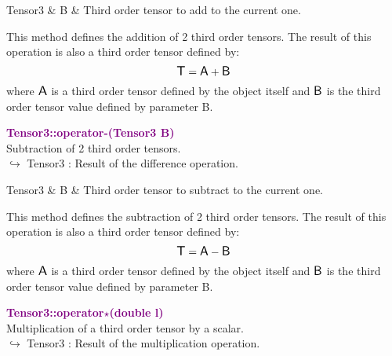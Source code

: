 \begin{tcolorbox}[width=\textwidth,myArgs,tabularx={ll|R}]
Tensor3 & B & Third order tensor to add to the current one.
\end{tcolorbox}

This method defines the addition of 2 third order tensors.
The result of this operation is also a third order tensor defined by:
\begin{equation*}
\mbox{\large\ensuremath{\mathsf{T}}} = \mbox{\large\ensuremath{\mathsf{A}}} + \mbox{\large\ensuremath{\mathsf{B}}}
\end{equation*}
where $\mbox{\large\ensuremath{\mathsf{A}}}$ is a third order tensor defined by the object itself and $\mbox{\large\ensuremath{\mathsf{B}}}$ is the third order tensor value defined by parameter B.

\textcolor{purple}{\textbf{Tensor3::operator-(Tensor3 B)}}\label{Tensor3::operator-(Tensor3 B)}\\
Subtraction of 2 third order tensors.\\ \hspace*{10mm}$\hookrightarrow$ Tensor3 : Result of the difference operation.

\begin{tcolorbox}[width=\textwidth,myArgs,tabularx={ll|R}]
Tensor3 & B & Third order tensor to subtract to the current one.
\end{tcolorbox}

This method defines the subtraction of 2 third order tensors.
The result of this operation is also a third order tensor defined by:
\begin{equation*}
\mbox{\large\ensuremath{\mathsf{T}}} = \mbox{\large\ensuremath{\mathsf{A}}} - \mbox{\large\ensuremath{\mathsf{B}}}
\end{equation*}
where $\mbox{\large\ensuremath{\mathsf{A}}}$ is a third order tensor defined by the object itself and $\mbox{\large\ensuremath{\mathsf{B}}}$ is the third order tensor value defined by parameter B.

\textcolor{purple}{\textbf{Tensor3::operator$\star$(double l)}}\label{Tensor3::operator*(double l)}\\
Multiplication of a third order tensor by a scalar.\\ \hspace*{10mm}$\hookrightarrow$ Tensor3 : Result of the multiplication operation.

